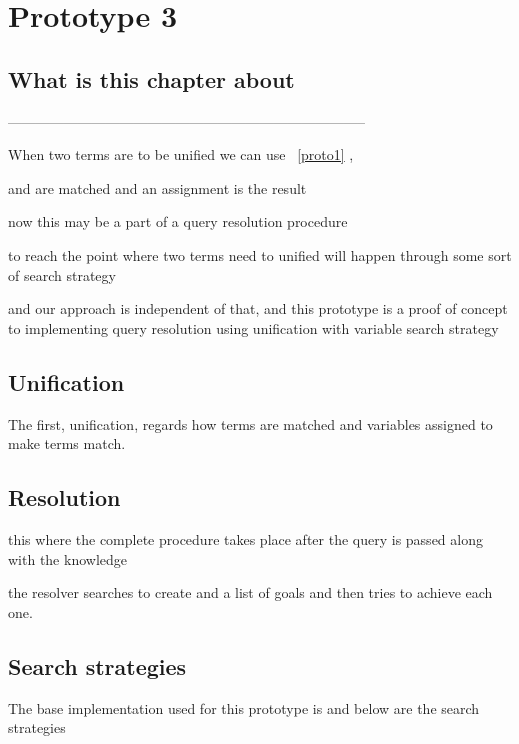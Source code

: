 \documentclass[thesis-solanki.tex]{files}
\begin{document}
\chapter{Prototype 3}{\label{proto3}}


\section{What is this chapter about}

-----------------------------------------------------------------------------

When two terms are to be unified we can use ~\ref{proto1} ,

 and  are matched and an assignment is the result 

now this may be a part of a query resolution procedure

to reach the point where two terms need to unified will happen through some sort of search strategy

and our approach is independent of that, and this prototype is a proof of concept to implementing query resolution using unification with
variable search strategy


\section{Unification}
The first, unification, regards how terms are matched and variables assigned to make terms
match.
\cite{website:prologunification}



\section{Resolution}
this where the complete procedure takes place after the query is passed along with the knowledge 

the resolver searches to create and a list of  goals and then tries to achieve each one.

\cite{website:prologresolution}

\cite{website:resolutionlogicwiki}




\section{Search strategies}
The base implementation used for this prototype  is \cite{website:mini-prolog-hugs98} and below are the search
strategies
\end{document}
